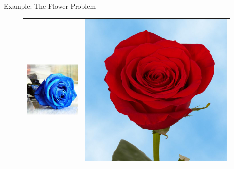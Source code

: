 \documentclass[mathserif]{beamer}
\begin{document}
\begin{frame}{Example: The Flower Problem}
\begin{figure}[H]
\centering
\begin{tabular}{cc}
\includegraphics[scale=0.3]{figures/brose.jpg} &\includegraphics[scale=0.1]{figures/rrose.jpg}
\end{tabular}
\end{figure}
\end{frame}
\end{document}
